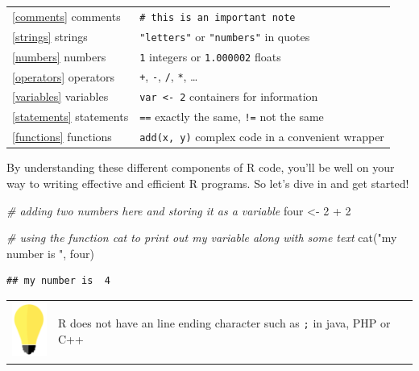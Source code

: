 \documentclass[
]{book}
\newenvironment{Shaded}{\begin{snugshade}}{\end{snugshade}}
\newcommand{\CommentTok}[1]{\textcolor[rgb]{0.56,0.35,0.01}{\textit{#1}}}
\newcommand{\DecValTok}[1]{\textcolor[rgb]{0.00,0.00,0.81}{#1}}
\newcommand{\FunctionTok}[1]{\textcolor[rgb]{0.00,0.00,0.00}{#1}}
\newcommand{\NormalTok}[1]{#1}
\newcommand{\OtherTok}[1]{\textcolor[rgb]{0.56,0.35,0.01}{#1}}
\newcommand{\SpecialCharTok}[1]{\textcolor[rgb]{0.00,0.00,0.00}{#1}}
\newcommand{\StringTok}[1]{\textcolor[rgb]{0.31,0.60,0.02}{#1}}
\begin{document}
\begin{longtable}[]{@{}
  >{\raggedright\arraybackslash}p{}
  >{\raggedright\arraybackslash}p{}@{}}
\toprule\noalign{}
\endhead
\bottomrule\noalign{}
\endlastfoot
\ref{comments} comments & \texttt{\#\ this\ is\ an\ important\ note} \\
\ref{strings} strings & \texttt{"letters"} or \texttt{"numbers"} in quotes \\
\ref{numbers} numbers & \texttt{1} integers or \texttt{1.000002} floats \\
\ref{operators} operators & \texttt{+}, \texttt{-}, \texttt{/}, \texttt{*}, \ldots{} \\
\ref{variables} variables & \texttt{var\ \textless{}-\ 2} containers for information \\
\ref{statements} statements & \texttt{==} exactly the same, \texttt{!=} not the same \\
\ref{functions} functions & \texttt{add(x,\ y)} complex code in a convenient wrapper \\
\end{longtable}

By understanding these different components of R code, you'll be well on your way to writing effective and efficient R programs. So let's dive in and get started!

\begin{Shaded}
\begin{Highlighting}[]
\CommentTok{\# adding two numbers here and storing it as a variable}
\NormalTok{four }\OtherTok{\textless{}{-}} \DecValTok{2} \SpecialCharTok{+} \DecValTok{2}

\CommentTok{\# using the function \textquotesingle{}cat\textquotesingle{} to print out my variable along with some text}
\FunctionTok{cat}\NormalTok{(}\StringTok{"my number is "}\NormalTok{, four)}
\end{Highlighting}
\end{Shaded}

\begin{verbatim}
## my number is  4
\end{verbatim}

\hfill\break

\begin{longtable}[]{@{}
  >{\raggedright\arraybackslash}p{}
  >{\raggedright\arraybackslash}p{}@{}}
\toprule\noalign{}
\endhead
\bottomrule\noalign{}
\endlastfoot
\includegraphics[width=\textwidth,height=0.70833in]{images/01.png} & R does not have an line ending character such as \texttt{;} in java, PHP or C++ \\
\end{longtable}
\end{document}
